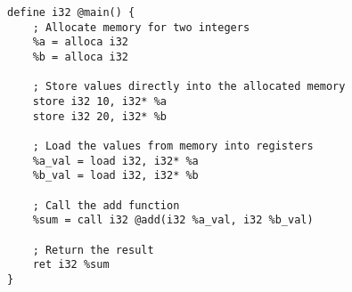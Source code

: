 \begin{lstlisting}[language=none]
define i32 @main() {
    ; Allocate memory for two integers
    %a = alloca i32
    %b = alloca i32

    ; Store values directly into the allocated memory
    store i32 10, i32* %a
    store i32 20, i32* %b

    ; Load the values from memory into registers
    %a_val = load i32, i32* %a
    %b_val = load i32, i32* %b

    ; Call the add function
    %sum = call i32 @add(i32 %a_val, i32 %b_val)

    ; Return the result
    ret i32 %sum
}
\end{lstlisting}
